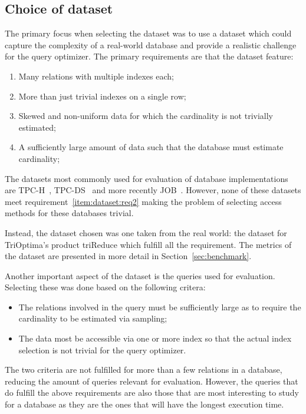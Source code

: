 \subsection{Choice of dataset}\label{sec:dataset}
The primary focus when selecting the dataset was to use a dataset which
could capture the complexity of a real-world database and provide a realistic
challenge for the query optimizer. The primary requirements are that the dataset
feature:
\begin{enumerate}
\item Many relations with multiple indexes each;
\item\label{item:dataset:req2} More than just trivial indexes on a single row;
\item Skewed and non-uniform data for which the cardinality is not trivially
  estimated;
\item A sufficiently large amount of data such that the database must estimate
  cardinality;
\end{enumerate}

The datasets most commonly used for evaluation of database implementations are
TPC-H~\cite{tpc_th}, TPC-DS~\cite{tpc_tha} and more recently
JOB~\cite{leis_2015_how_hgaqor}. However, none of these datasets meet
requirement~\ref{item:dataset:req2} making the problem of selecting access
methods for these databases trivial.

Instead, the dataset chosen was one taken from the real world: the dataset for
TriOptima's product triReduce which fulfill all the requirement. The metrics of
the dataset are presented in more detail in Section~\ref{sec:benchmark}.

Another important aspect of the dataset is the queries used for evaluation.
Selecting these was done based on the following critera:
\begin{itemize}
\item The relations involved in the query must be sufficiently large as to require the
  cardinality to be estimated via sampling;
\item The data most be accessible via one or more index so that the actual index
  selection is not trivial for the query optimizer.
\end{itemize}

The two criteria are not fulfilled for more than a few relations in a database,
reducing the amount of queries relevant for evaluation. However, the queries
that do fulfill the above requirements are also those that are most interesting
to study for a database as they are the ones that will have the longest execution time.

